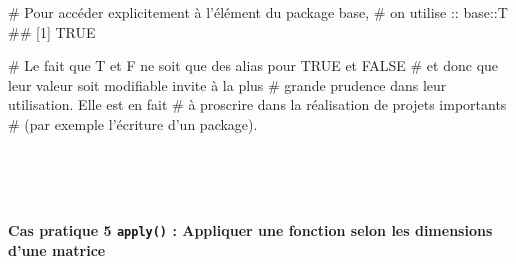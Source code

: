 \documentclass[12pt,]{article}
\newenvironment{Shaded}{}{}
\newcommand{\CommentTok}[1]{\textcolor[rgb]{0.00,0.50,0.00}{{#1}}}
\newcommand{\NormalTok}[1]{{#1}}
\let\oldparagraph\paragraph
\renewcommand{\paragraph}[1]{\oldparagraph{#1}\mbox{}}
\begin{document}
\begin{enumerate}
\begin{Shaded}
\begin{Highlighting}[]
\CommentTok{# Pour accéder explicitement à l'élément du package base,}
\CommentTok{# on utilise ::}
\NormalTok{base::T}
\NormalTok{## [1] TRUE}

\CommentTok{# Le fait que T et F ne soit que des alias pour TRUE et FALSE}
\CommentTok{# et donc que leur valeur soit modifiable invite à la plus}
\CommentTok{# grande prudence dans leur utilisation. Elle est en fait}
\CommentTok{# à proscrire dans la réalisation de projets importants }
\CommentTok{# (par exemple l'écriture d'un package).}
\end{Highlighting}
\end{Shaded}

  ~
\end{enumerate}

~

\paragraph{\texorpdfstring{\textbf{Cas pratique 5} \texttt{apply()} :
Appliquer une fonction selon les dimensions d'une
matrice}{Cas pratique 5 apply() : Appliquer une fonction selon les dimensions d'une matrice}}\label{cas-pratique-5-apply-appliquer-une-fonction-selon-les-dimensions-dune-matrice}
\end{document}
